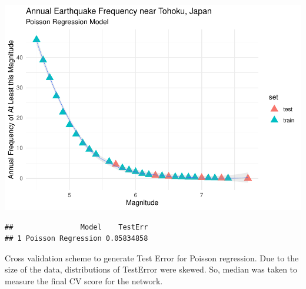 \includegraphics{Appendix_eq_files/figure-latex/unnamed-chunk-3-1.pdf}

\begin{Shaded}
\begin{Highlighting}[]
\CommentTok{\# }
\OtherTok{\textless{}{-}} \NormalTok{(} \NormalTok{,}
                            \SpecialCharTok{$}\SpecialCharTok{{-}}\SpecialCharTok{$}\SpecialCharTok{\^{}}\NormalTok{))}
\end{Highlighting}
\end{Shaded}

\begin{verbatim}
##                Model    TestErr
## 1 Poisson Regression 0.05834858
\end{verbatim}

Cross validation scheme to generate Test Error for Poisson regression.
Due to the size of the data, distributions of TestError were skewed. So,
median was taken to measure the final CV score for the network.

